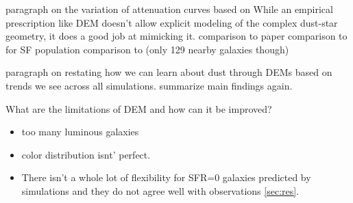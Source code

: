 



paragraph on the variation of attenuation curves based on 
While an empirical prescription like DEM doesn't allow explicit modeling of the
complex dust-star geometry, it does a good job at mimicking it. 
comparison to \cite{narayanan2018} paper 
comparison to \cite{salim2018} for SF population  
comparison to \cite{leja2017} (only 129 nearby galaxies though) 


paragraph on restating how we can learn about dust through DEMs based on trends we see
across all simulations. summarize main findings again. 

What are the limitations of DEM and how can it be improved? 
\begin{itemize}
    \item too many luminous galaxies
    \item color distribution isnt' perfect. 
    \item There isn't a whole lot of flexibility for SFR=0 galaxies predicted by
    simulations and they do not agree well with observations \ref{sec:res}. 
\end{itemize}


